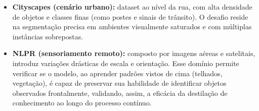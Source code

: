 
\begin{itemize}

\item \textbf{Cityscapes (cenário urbano):} dataset ao nível da rua, com alta densidade de objetos e classes finas (como postes e sinais de trânsito). O desafio reside na segmentação precisa em ambientes visualmente saturados e com múltiplas instâncias sobrepostas. %

\item \textbf{NLPR (sensoriamento remoto):} composto por imagens aéreas e satelitais, introduz variações drásticas de escala e orientação. Esse domínio permite verificar se o modelo, ao aprender padrões vistos de cima (telhados, vegetação), é capaz de preservar sua habilidade de identificar objetos observados frontalmente, validando, assim, a eficácia da destilação de conhecimento ao longo do processo contínuo. %
\end{itemize}

